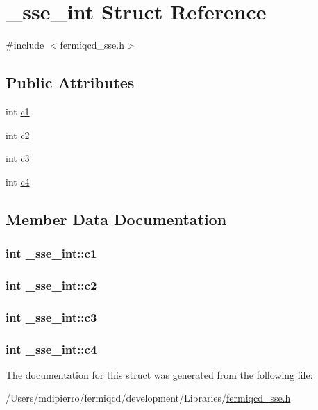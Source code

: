 \hypertarget{struct__sse__int}{
\section{\_\-sse\_\-int Struct Reference}
\label{struct__sse__int}
}


{\ttfamily \#include $<$fermiqcd\_\-sse.h$>$}\subsection*{Public Attributes}
\begin{DoxyCompactItemize}
\item 
int \hyperlink{struct__sse__int_a1ac144507afd68eea44c66d3f786ee25}{c1}
\item 
int \hyperlink{struct__sse__int_a4fde25f471d3432ea95ec9f86353ccf4}{c2}
\item 
int \hyperlink{struct__sse__int_a0efccd24a6d26af756d8179c84d86e20}{c3}
\item 
int \hyperlink{struct__sse__int_a1164af362aa7ed03d99e88f19e1cbdc7}{c4}
\end{DoxyCompactItemize}


\subsection{Member Data Documentation}
\hypertarget{struct__sse__int_a1ac144507afd68eea44c66d3f786ee25}{
\subsubsection[{c1}]{\setlength{\rightskip}{0pt plus 5cm}int {\bf \_\-sse\_\-int::c1}}}
\label{struct__sse__int_a1ac144507afd68eea44c66d3f786ee25}
\hypertarget{struct__sse__int_a4fde25f471d3432ea95ec9f86353ccf4}{
\subsubsection[{c2}]{\setlength{\rightskip}{0pt plus 5cm}int {\bf \_\-sse\_\-int::c2}}}
\label{struct__sse__int_a4fde25f471d3432ea95ec9f86353ccf4}
\hypertarget{struct__sse__int_a0efccd24a6d26af756d8179c84d86e20}{
\subsubsection[{c3}]{\setlength{\rightskip}{0pt plus 5cm}int {\bf \_\-sse\_\-int::c3}}}
\label{struct__sse__int_a0efccd24a6d26af756d8179c84d86e20}
\hypertarget{struct__sse__int_a1164af362aa7ed03d99e88f19e1cbdc7}{
\subsubsection[{c4}]{\setlength{\rightskip}{0pt plus 5cm}int {\bf \_\-sse\_\-int::c4}}}
\label{struct__sse__int_a1164af362aa7ed03d99e88f19e1cbdc7}


The documentation for this struct was generated from the following file:\begin{DoxyCompactItemize}
\item 
/Users/mdipierro/fermiqcd/development/Libraries/\hyperlink{fermiqcd__sse_8h}{fermiqcd\_\-sse.h}\end{DoxyCompactItemize}

